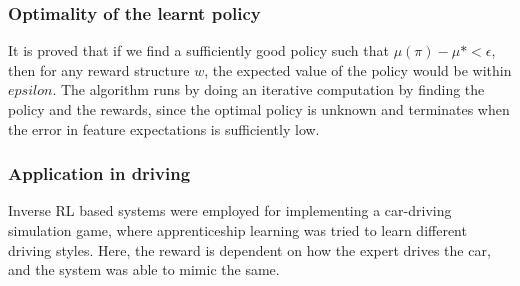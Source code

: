 \documentclass[hidelinks,BTech]{iitmdiss}
\begin{document}
\subsubsection*{Optimality of the learnt policy}
It is proved that if we find a sufficiently good policy such that $\mu(\pi)-\mu*<\epsilon$, then for any reward structure $w$, the expected value of the policy would be within $epsilon$. The algorithm runs by doing an iterative computation by finding the policy and the rewards, since the optimal policy is unknown and terminates when the error in feature expectations is sufficiently low.

\subsubsection*{Application in driving}
Inverse RL based systems were employed for implementing a car-driving simulation game, where apprenticeship learning was tried to learn different driving styles. Here, the reward is dependent on how the expert drives the car, and the system was able to mimic the same.
\end{document}
